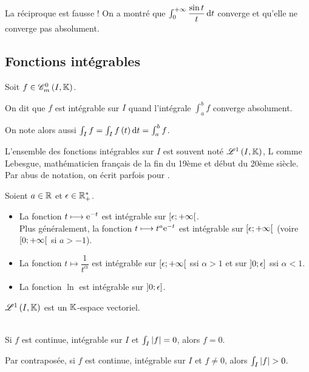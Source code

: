 \begin{rem}
La réciproque est fausse ! On a montré que \(\int_0^{\pinf}\dfrac{\sin t}{t}\odif{t}\) converge et qu'elle ne converge pas absolument.
\end{rem}

\subsection{Fonctions intégrables}

\begin{defi}
Soit \(f\in\contm[I]\).

On dit que \(f\) est intégrable sur \(I\) quand l'intégrale \(\int_a^bf\) converge absolument.

On note alors aussi \(\int_If=\int_If\paren{t}\odif{t}=\int_a^bf\).
\end{defi}

L'ensemble des fonctions intégrables sur \(I\) est souvent noté \(\integ{1}{I}{\K}\), L comme Lebesgue, mathématicien français de la fin du 19ème et début du 20ème siècle. Par abus de notation, on écrit parfois  pour .

\begin{ex}
Soient \(a\in\mathbb{R}\) et \(\epsilon\in\mathbb{R}_+^*\).

\begin{itemize}
    \item La fonction \(t\longmapsto\mathrm{e}^{-t}\) est intégrable sur \(\left[\epsilon;+\infty\right[\). \\ Plus généralement, la fonction \(t\longmapsto t^a\mathrm{e}^{-t}\) est intégrable sur \(\left[\epsilon;+\infty\right[\) (voire \(\left[0;+\infty\right[\) si \(a>-1\)). \\
    \item La fonction \(t\mapsto\dfrac{1}{t^\alpha}\) est intégrable sur \(\left[\epsilon;+\infty\right[\) ssi \(\alpha>1\) et sur \(\left]0;\epsilon\right]\) ssi \(\alpha<1\). \\
    \item La fonction \(\ln\) est intégrable sur \(\left]0;\epsilon\right]\).
\end{itemize}
\end{ex}

\begin{prop}
\(\integ{1}{I}{\K}\) est un \(\mathbb{K}\)-espace vectoriel.
\end{prop}

\begin{prop}~\\
Si \(f\) est continue, intégrable sur \(I\) et \(\int_I\left\lvert f\right\rvert=0\), alors \(f=0\).

Par contraposée, si \(f\) est continue, intégrable sur \(I\) et \(f\not=0\), alors \(\int_I\left\lvert f\right\rvert>0\).
\end{prop}

